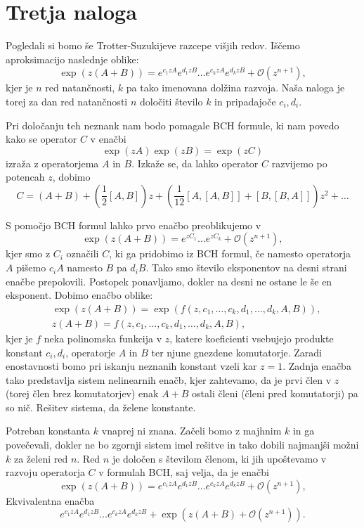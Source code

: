 \documentclass{article}
\begin{document}
\section*{Tretja naloga}

Pogledali si bomo še Trotter-Suzukijeve razcepe višjih redov.
Iščemo aproksimacijo naslednje oblike:
\begin{equation*}
\exp(z(A+B)) = e^{c_1 z A} e^{d_1 z B} \dots e^{c_k z A}e^{d_k z B} + \mathcal{O}(z^{n+1}),
\end{equation*}
kjer je $n$ red natančnosti, $k$ pa tako imenovana dolžina razvoja. Naša naloga je torej za dan red natančnosti $n$ določiti število $k$ in pripadajoče $c_i, d_i$.

Pri določanju teh neznank nam bodo pomagale BCH formule, ki nam povedo kako se operator $C$ v enačbi
\begin{equation*}
\exp(zA)\exp(zB) = \exp(zC)
\end{equation*}
izraža z operatorjema $A$ in $B$.
Izkaže se, da lahko operator $C$ razvijemo po potencah $z$, dobimo 
\begin{equation*}
C = \left( A+B \right) + \left( \frac{1}{2}[A,B] \right)z + \left(\frac{1}{12} [A,[A,B]] + [B,[B,A]]\right) z^2 + \dots
\end{equation*}

S pomočjo BCH formul lahko prvo enačbo preoblikujemo v 
\begin{equation*}
\exp(z(A+B)) = e^{z C_1} \dots e^{z C_k} + \mathcal{O}(z^{n+1}),
\end{equation*}
kjer smo z $C_i$ označili $C$, ki ga pridobimo iz BCH formul, če namesto operatorja $A$ pišemo $c_i A$ namesto $B$ pa $d_i B$. Tako smo število eksponentov na desni strani enačbe prepolovili. Postopek ponavljamo, dokler na desni ne ostane le še en eksponent.
Dobimo enačbo oblike:
\begin{align*}
&\exp(z(A+B)) = \exp(f(z,c_1, \dots, c_k, d_1, \dots , d_k, A, B)), \\
&z(A+B) = f(z,c_1, \dots, c_k, d_1, \dots , d_k, A, B),
\end{align*}
kjer je $f$ neka polinomska funkcija v $z$, katere koeficienti vsebujejo produkte konstant $c_i, d_i$, operatorje $A$ in $B$ ter njune gnezdene komutatorje. Zaradi enostavnosti bomo pri iskanju neznanih konstant vzeli kar $z=1$. Zadnja enačba tako predstavlja sistem nelinearnih enačb, kjer zahtevamo, da je prvi člen v $z$ (torej člen brez komutatorjev) enak $A+B$ ostali členi (členi pred komutatorji) pa so nič. Rešitev sistema, da želene konstante.

Potreban konstanta $k$ vnaprej ni znana. Začeli bomo z majhnim $k$ in ga povečevali, dokler ne bo zgornji sistem imel rešitve in tako dobili najmanjši možni $k$ za želeni red $n$.
Red $n$ je določen s številom členom, ki jih upoštevamo v razvoju operatorja $C$ v formulah BCH, saj velja, da je enačbi 
\begin{equation*}
\exp(z(A+B)) = e^{c_1 z A} e^{d_1 z B} \dots e^{c_k z A}e^{d_k z B} + \mathcal{O}(z^{n+1}),
\end{equation*}
Ekvivalentna enačba
\begin{equation*}
e^{c_1 z A} e^{d_1 z B} \dots e^{c_k z A}e^{d_k z B} + \exp(z(A+B) + \mathcal{O}(z^{n+1})).
\end{equation*}
\end{document}
